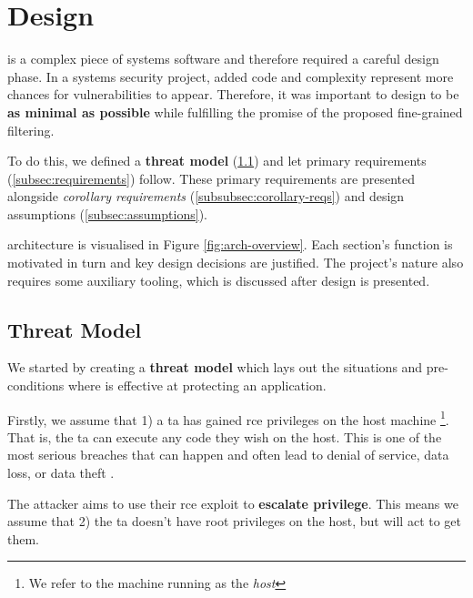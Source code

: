 \section{Design} \label{sec:design}

%
        

\af is a complex piece of systems software and therefore required a
careful design phase. In a systems security project, added code and complexity
represent more chances for vulnerabilities to appear. Therefore, it was
important to design \af to be \textbf{as minimal as possible} while fulfilling
the promise of the proposed fine-grained filtering.

To do this, we defined a \textbf{threat model} (\ref{subsec:threat-model}) and
let primary requirements (\ref{subsec:requirements}) follow. These primary
requirements are presented alongside \textit{corollary requirements}
(\ref{subsubsec:corollary-reqs}) and design assumptions
(\ref{subsec:assumptions}).

\afg architecture is visualised in Figure \ref{fig:arch-overview}. Each
section's function is motivated in turn and key design decisions are justified.
The project's nature also requires some auxiliary tooling, which is discussed
after \afg design is presented.

\subsection{Threat Model}\label{subsec:threat-model}

We started by creating a \textbf{threat model} which lays out the situations and
pre-conditions where \af is effective at protecting an application.

Firstly, we assume that 1) a \ac{ta} has gained \ac{rce} privileges on the host
machine \footnote{We refer to the machine running \af as the \textit{host
}}. That is, the \ac{ta} can execute any code they wish on the host. This is
one of the most serious breaches that can happen and often lead to denial of
service, data loss, or data theft \cite{RCE_BAD}. 

The attacker aims to use their \ac{rce} exploit to \textbf{escalate privilege}. This
means we assume that 2) the \ac{ta} doesn't have root privileges on the host,
but will act to get them.

